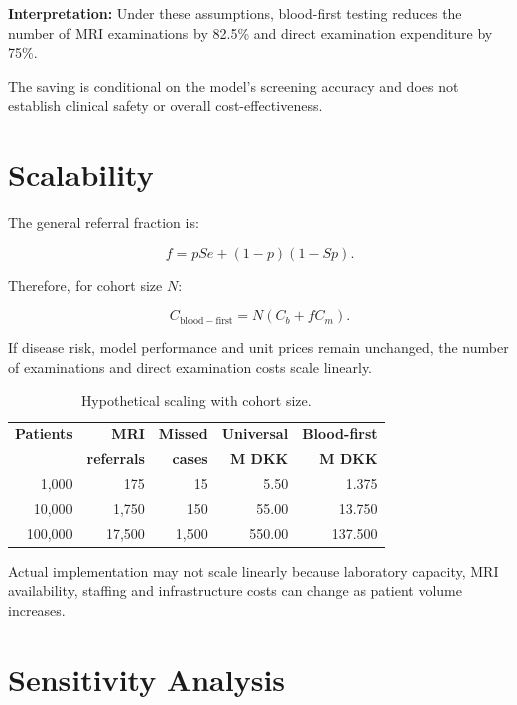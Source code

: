 \documentclass[11pt,a4paper]{article}
\begin{document}
\textbf{Interpretation:}
Under these assumptions, blood-first testing
reduces the number of MRI examinations by 82.5\%
and direct examination expenditure by 75\%.

The saving is conditional on the model's screening
accuracy and does not establish clinical safety
or overall cost-effectiveness.

\section{Scalability}

The general referral fraction is:

\[
f=pSe+(1-p)(1-Sp).
\]

Therefore, for cohort size $N$:

\[
C_{\mathrm{blood-first}}
=N\left(C_b+fC_m\right).
\]

If disease risk, model performance and unit prices
remain unchanged, the number of examinations
and direct examination costs scale linearly.

\begin{table}[H]
\centering
\caption{Hypothetical scaling with cohort size.}
\small
\begin{tabular}{@{}rrrrr@{}}
\toprule
\textbf{Patients} &
\textbf{MRI} &
\textbf{Missed} &
\textbf{Universal} &
\textbf{Blood-first} \\
& \textbf{referrals} &
\textbf{cases} &
\textbf{M DKK} &
\textbf{M DKK} \\
\midrule
1,000 & 175 & 15 & 5.50 & 1.375 \\
10,000 & 1,750 & 150 & 55.00 & 13.750 \\
100,000 & 17,500 & 1,500 & 550.00 & 137.500 \\
\bottomrule
\end{tabular}
\end{table}

Actual implementation may not scale linearly
because laboratory capacity, MRI availability,
staffing and infrastructure costs can change
as patient volume increases.

\section{Sensitivity Analysis}
\end{document}
